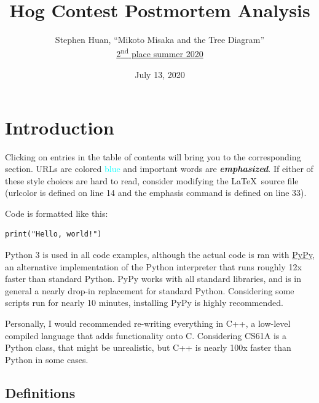 \documentclass[11pt, oneside]{article}
\title{Hog Contest Postmortem Analysis}
\author{Stephen Huan, ``Mikoto Misaka and the Tree Diagram'' \\
\href{https://hog-contest.cs61a.org/winners}{2\textsuperscript{nd} place summer 2020}}
\date{July 13, 2020}
\newcommand{\emphasis}[1]{\textbf{\textit{#1}}}
\begin{document}
\maketitle
\tableofcontents

\newpage

\section{Introduction}

Clicking on entries in the table of contents 
will bring you to the corresponding section. 
URLs are colored \textcolor{cyan}{blue} and 
important words are \emphasis{emphasized}.
If either of these style choices are hard to read,
consider modifying the \LaTeX \ source file
(urlcolor is defined on line 14 and the emphasis command is defined on line 33).

Code is formatted like this:
\begin{verbatim}
print("Hello, world!")
\end{verbatim}

Python 3 is used in all code examples, although 
the actual code is ran with \href{https://www.pypy.org/}{PyPy}, an alternative
implementation of the Python interpreter that runs roughly 12x faster 
than standard Python. PyPy works with all standard libraries,
and is in general a nearly drop-in replacement for standard Python.
Considering some scripts run for nearly 10 minutes, installing 
PyPy is highly recommended.

Personally, I would recommended re-writing everything in C++, a low-level
compiled language that adds functionality onto C. Considering CS61A
is a Python class, that might be unrealistic, but C++ is nearly 
100x faster than Python in some cases.

\subsection{Definitions}
\end{document}
